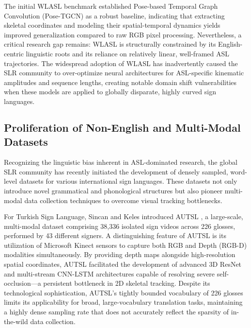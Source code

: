 \documentclass{ieeeaccess}
\begin{document}
The initial WLASL benchmark established Pose-based Temporal Graph Convolution (Pose-TGCN) as a robust baseline, indicating that extracting skeletal coordinates and modeling their spatial-temporal dynamics yields improved generalization compared to raw RGB pixel processing. Nevertheless, a critical research gap remains: WLASL is structurally constrained by its English-centric linguistic roots and its reliance on relatively linear, well-framed ASL trajectories. The widespread adoption of WLASL has inadvertently caused the SLR community to over-optimize neural architectures for ASL-specific kinematic amplitudes and sequence lengths, creating notable domain shift vulnerabilities when these models are applied to globally disparate, highly curved sign languages.

\subsection{Proliferation of Non-English and Multi-Modal Datasets}
Recognizing the linguistic bias inherent in ASL-dominated research, the global SLR community has recently initiated the development of densely sampled, word-level datasets for various international sign languages. These datasets not only introduce novel grammatical and phonological structures but also pioneer multi-modal data collection techniques to overcome visual tracking bottlenecks. 

For Turkish Sign Language, Sincan and Keles introduced AUTSL \cite{sincan2020autsl}, a large-scale, multi-modal dataset comprising 38,336 isolated sign videos across 226 glosses, performed by 43 different signers. A distinguishing feature of AUTSL is its utilization of Microsoft Kinect sensors to capture both RGB and Depth (RGB-D) modalities simultaneously. By providing depth maps alongside high-resolution spatial coordinates, AUTSL facilitated the development of advanced 3D ResNet \cite{he2016deep} and multi-stream CNN-LSTM architectures capable of resolving severe self-occlusion—a persistent bottleneck in 2D skeletal tracking. Despite its technological sophistication, AUTSL's tightly bounded vocabulary of 226 glosses limits its applicability for broad, large-vocabulary translation tasks, maintaining a highly dense sampling rate that does not accurately reflect the sparsity of in-the-wild data collection.
\end{document}
